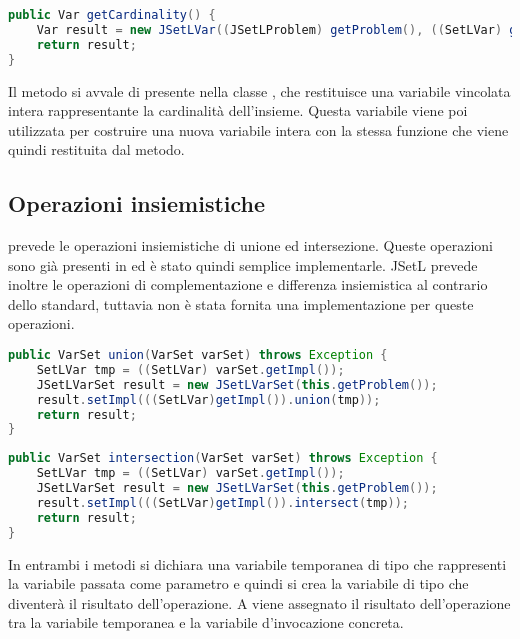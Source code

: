 \begin{lstlisting}[language = Java,
                   caption = {``getter'' per la cardinalità.}]
public Var getCardinality() {
	Var result = new JSetLVar((JSetLProblem) getProblem(), ((SetLVar) getImpl()).card());
	return result;
}
\end{lstlisting}
Il metodo si avvale di  presente nella classe , che
restituisce una variabile vincolata intera rappresentante la cardinalità 
dell'insieme. Questa variabile viene poi utilizzata per costruire una nuova
variabile intera  con la stessa funzione che viene quindi
restituita dal metodo.

\subsection{Operazioni insiemistiche}
 prevede le operazioni insiemistiche di unione ed intersezione.
Queste operazioni sono già presenti in  ed è stato quindi 
semplice implementarle. JSetL prevede inoltre le operazioni di complementazione
e differenza insiemistica al contrario dello standard, tuttavia non è stata
fornita una implementazione per queste operazioni.

\begin{lstlisting}[language = Java,
                   caption = {unione insiemistica.}]
public VarSet union(VarSet varSet) throws Exception {
	SetLVar tmp = ((SetLVar) varSet.getImpl());
	JSetLVarSet result = new JSetLVarSet(this.getProblem());
	result.setImpl(((SetLVar)getImpl()).union(tmp));
	return result;
}
\end{lstlisting}

\begin{lstlisting}[language = Java,
                   caption = {intersezione insiemistica.}]
public VarSet intersection(VarSet varSet) throws Exception {
	SetLVar tmp = ((SetLVar) varSet.getImpl());
	JSetLVarSet result = new JSetLVarSet(this.getProblem());
	result.setImpl(((SetLVar)getImpl()).intersect(tmp));
	return result;
}
\end{lstlisting}

In entrambi i metodi si dichiara una variabile temporanea di tipo 
 che rappresenti la variabile passata come parametro e quindi si 
crea la variabile di tipo  che diventerà il risultato 
dell'operazione. A  viene assegnato il risultato
dell'operazione tra la
variabile temporanea e la variabile d'invocazione concreta.


